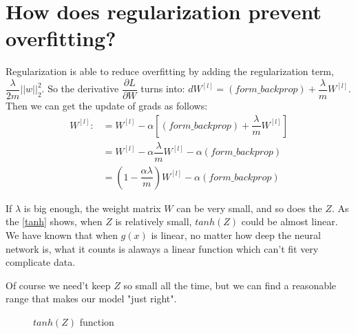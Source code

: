 \documentclass{article}
\begin{document}
\section{How does regularization prevent overfitting?}
\indent Regularization is able to reduce overfitting by adding the regularization term, $\dfrac{\lambda}{2m}||w||_{2}^{2}$. So the derivative $\dfrac{\partial L}{\partial W}$ turns into: $dW^{[l]}=(form\_backprop)+\dfrac{\lambda}{m}W^{[l]}$. Then we can get the update of grads as follows:
\begin{align}
W^{[l]}:&=W^{[l]}-\alpha [ (form\_backprop)+\dfrac{\lambda}{m}W^{[l]}]\\
&=W^{[l]}-\alpha\dfrac{\lambda}{m}W^{[l]}-\alpha(form\_backprop)\\
&=(1-\dfrac{\alpha\lambda}{m})W^{[l]}-\alpha(form\_backprop)
\end{align} 




\indent If $\lambda$ is big enough, the weight matrix $W$ can be very small, and so does the $Z$. As the \autoref{tanh} shows, when $Z$ is relatively small, $tanh(Z)$ could be almost linear. We have known that when $g(x)$ is linear, no matter how deep the neural network is, what it counts is alaways a linear function which can't fit very complicate data.

\indent Of course we need't keep $Z$ so small all the time, but we can find a reasonable range that makes our model "just right".

\par
\begin{figure}[htbp]
\caption{$tanh(Z)$ function}
\label{tanh}%
\end{figure}
\end{document}
